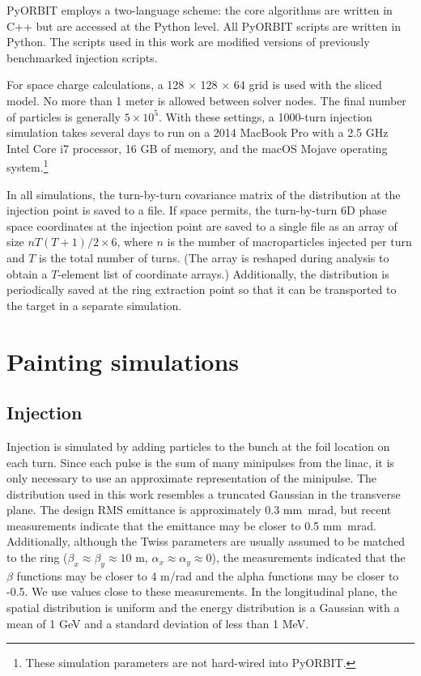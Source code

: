 PyORBIT employs a two-language scheme: the core algorithms are written in C++ but are accessed at the Python level. All PyORBIT scripts are written in Python. The scripts used in this work are modified versions of previously benchmarked injection scripts.

For space charge calculations, a 128 $\times$ 128 $\times$ 64 grid is used with the sliced model. No more than 1 meter is allowed between solver nodes. The final number of particles is generally $5 \times 10^{5}$. With these settings, a 1000-turn injection simulation takes several days to run on a 2014 MacBook Pro with a 2.5 GHz Intel Core i7 processor, 16 GB of memory, and the macOS Mojave operating system.\footnote{These simulation parameters are not hard-wired into PyORBIT.}

In all simulations, the turn-by-turn covariance matrix of the distribution at the injection point is saved to a file. If space permits, the turn-by-turn 6D phase space coordinates at the injection point are saved to a single file as an array of size $n T (T + 1) / 2 \times 6$, where $n$ is the number of macroparticles injected per turn and $T$ is the total number of turns. (The array is reshaped during analysis to obtain a $T$-element list of coordinate arrays.) Additionally, the distribution is periodically saved at the ring extraction point so that it can be transported to the target in a separate simulation.





\section{Painting simulations}

\subsection{Injection}

Injection is simulated by adding particles to the bunch at the foil location on each turn. Since each pulse is the sum of many minipulses from the linac, it is only necessary to use an approximate representation of the minipulse. The distribution used in this work resembles a truncated Gaussian in the transverse plane. The design RMS emittance is approximately 0.3 mm~mrad, but recent measurements indicate that the emittance may be closer to 0.5 mm~mrad. Additionally, although the Twiss parameters are usually assumed to be matched to the ring ($\beta_x \approx \beta_y \approx 10$ m, $\alpha_x \approx \alpha_y \approx 0$), the measurements indicated that the $\beta$ functions may be closer to 4 m/rad and the alpha functions may be closer to -0.5. We use values close to these measurements. In the longitudinal plane, the spatial distribution is uniform and the energy distribution is a Gaussian with a mean of 1 GeV and a standard deviation of less than 1 MeV.

